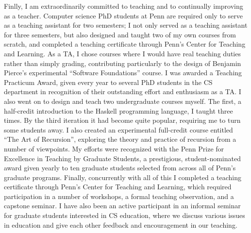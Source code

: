\documentclass{article}
\begin{document}
Finlly, I am extraordinarily committed to teaching and to continually
improving as a teacher.  Computer science PhD students at Penn are
required only to serve as a teaching assistant for two semesters; I
not only served as a teaching assistant for three semesters, but also
designed and taught two of my own courses from scratch, and completed
a teaching certificate through Penn's Center for Teaching and
Learning.  As a TA, I chose courses where I would have real teaching
duties rather than simply grading, contributing particularly to the
design of Benjamin Pierce's experimental ``Software Foundations''
course. I was awarded a Teaching Practicum Award, given every year to
several PhD students in the CS department in recognition of their
outstanding effort and enthusiasm as a TA.  I also went on to design
and teach two undergraduate courses myself. The first, a half-credit
introduction to the Haskell programming language, I taught three
times.  By the third iteration it had become quite popular, requiring
me to turn some students away.  I also created an experimental
full-credit course entitled ``The Art of Recursion'', exploring the
theory and practice of recursion from a number of viewpoints.  My
efforts were recognized with the Penn Prize for Excellence in Teaching
by Graduate Students, a prestigious, student-nominated award given
yearly to ten graduate students selected from across all of Penn's
graduate programs.  Finally, concurrently with all of this I completed
a teaching certificate through Penn's Center for Teaching and
Learning, which required participation in a number of workshops, a
formal teaching observation, and a capstone seminar.  I have also been
an active participant in an informal seminar for graduate students
interested in CS education, where we discuss various issues in
education and give each other feedback and encouragement in our
teaching.
\end{document}
